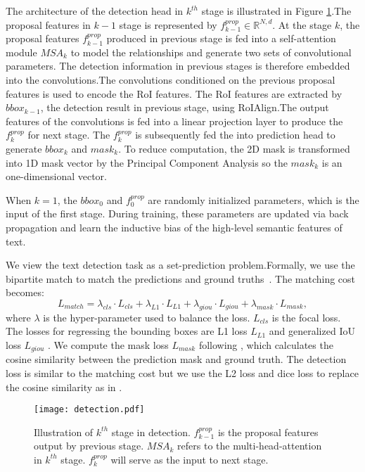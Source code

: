 \documentclass[10pt,twocolumn,letterpaper]{article}
\begin{document}
The architecture of the detection head in $k^{th}$ stage is illustrated in Figure \ref{fig:detector}.The proposal features in $k-1$ stage is represented by $f_{k-1}^{prop} \in \mathbb R^{N, d}$.
At the stage $k$, 
the proposal features $f_{k-1}^{prop}$ produced in previous stage is fed into a self-attention module\cite{vaswani2017attention} $MSA_{k}$ to model the relationships and generate two sets of convolutional parameters.
The detection information in previous stages is therefore embedded into the convolutions.The convolutions conditioned on the previous proposal features is used to encode the RoI features.
The RoI features are extracted by $bbox_{k-1}$, the detection result in previous stage, using RoIAlign\cite{he2017mask}.The output features of the convolutions is fed into a linear projection layer to produce the $f_{k}^{prop}$ for next stage. 
The $f_{k}^{prop}$ is subsequently fed the into prediction head to generate $bbox_{k}$ and $mask_{k}$.
To reduce computation, the 2D mask is transformed into 1D mask vector by the Principal Component Analysis\cite{wold1987principal} so the $mask_{k}$ is an one-dimensional vector.


When $k=1$, the $bbox_{0}$ and $f_{0}^{prop}$ are randomly initialized parameters, which is the input of the first stage. 
During training, these parameters are updated via back propagation and learn the inductive bias of the high-level semantic features of text.

We view the text detection task as a set-prediction problem.Formally, we use the bipartite match to match the predictions and ground truths~\cite{carion2020end,stewart2016end,sun2021sparse,hu2021istr}. The matching cost becomes:
\begin{equation}
L_{match} = \lambda_{cls} \cdot L_{cls} + \lambda_{L1} \cdot L_{L1} + \lambda_{giou} \cdot L_{giou} + \lambda_{mask} \cdot L_{mask},\label{XX}
\end{equation}
where $\lambda$ is the hyper-parameter used to balance the loss. $L_{cls}$ is the focal loss\cite{lin2017focal}. 
The losses for regressing the bounding boxes are L1 loss $L_{L1}$ and generalized IoU loss $L_{giou}$ \cite{rezatofighi2019generalized}. 
We compute the mask loss $L_{mask}$ following \cite{hu2021istr}, which calculates the cosine similarity between the prediction mask and ground truth. The detection loss is similar to the matching cost but we use the L2 loss and dice loss \cite{milletari2016v} to replace the cosine similarity as in \cite{hu2021istr}.


\begin{figure}[t!]
    \centering
    \texttt{[image: detection.pdf]}
    \caption{Illustration of $k^{th}$ stage in detection. $f_{k-1}^{prop}$ is the proposal features output by previous stage. 
    $MSA_{k}$ refers to the multi-head-attention in $k^{th}$ stage. $f_{k}^{prop}$ will serve as the input to next stage.
    }
    \label{fig:detector}
\end{figure}
\end{document}

